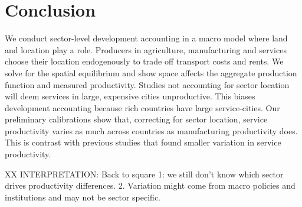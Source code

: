 \documentclass[12pt]{article}
\newcommand{\dofigure}[3]{\begin{figure}
\begin{centering}
\texttt{[image: figures/\#1]}
  \caption{#2\label{fig:#1}}
\end{centering}

\noindent \footnotesize{#3}
\end{figure}}
\begin{document}
%
%
%
%




\section{Conclusion}
We conduct sector-level development accounting in a macro model where land and location play a role. Producers in agriculture, manufacturing and services choose their location endogenously to trade off transport costs and rents. We solve for the spatial equilibrium and show space affects the aggregate production function and measured productivity. Studies not accounting for sector location will deem services in large, expensive cities unproductive. This biases development accounting because rich countries have large service-cities. Our preliminary calibrations show that, correcting for sector location, service productivity varies as much across countries as manufacturing productivity does. This is contrast with previous studies that found smaller variation in service productivity.

XX INTERPRETATION: Back to square 1: we still don’t know which sector drives productivity differences.
2. Variation might come from macro policies and institutions and may not be sector specific.

\clearpage
\end{document}
